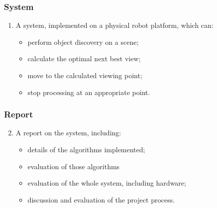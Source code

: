 
\begin{frame}[t]
	\frametitle{System}

	\begin{enumerate}
		
		\item A system, implemented on a physical robot platform, which can:
		
		\vfill

		\begin{itemize}\itemsep10pt
			\item<+-> perform object discovery on a scene;
			\item<+-> calculate the optimal next best view;
			\item<+-> move to the calculated viewing point;
			\item<+-> stop processing at an appropriate point.
		\end{itemize}
		\vfill

	\end{enumerate}

\end{frame}


\begin{frame}[t]
	\frametitle{Report}

	\begin{enumerate}
	\setcounter{enumi}{1}

		\item A report on the system, including:
		
		\vfill

		\begin{itemize}\itemsep8pt
			\item<1-> details of the algorithms implemented;
			\item<2-> evaluation of those algorithms
			\item<3-> evaluation of the whole system, including hardware;
			\item<4-> discussion and evaluation of the project process.
		\end{itemize}

	\end{enumerate}

	\vfill

\end{frame}